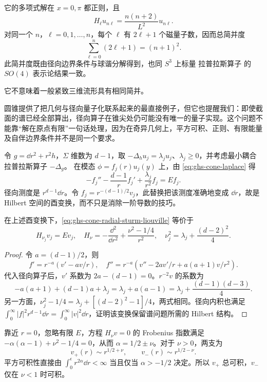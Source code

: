 它的多项式解在 $x=0,\pi$ 都正则，且
\[
 H_\ell u_{n\ell}=\frac{n(n+2)}{L^2}u_{n\ell}.
\]
对同一个 $n$，$\ell=0,1,\ldots,n$，每个 $\ell$ 有 $2\ell+1$ 个磁量子数，因而总简并度
\[
 \sum_{\ell=0}^{n}(2\ell+1)=(n+1)^2.
\]
此简并度既由径向边界条件与球谐分解得到，也同 $S^3$ 上标量 拉普拉斯算子 的 $SO(4)$ 表示论结果一致。

它不意味着一般紧致三维流形具有相同简并。

圆锥提供了把几何与径向量子化联系起来的最直接例子，但它也提醒我们：即使截面的谱已经全部算出，径向算子在锥尖处仍可能没有唯一的量子实现。这个问题不能靠“解在原点有限”一句话处理，因为在奇异几何上，平方可积、正则、有限能量及自伴边界条件并不是同一个要求。

令 $g=\dd r^2+r^2h$，$\Sigma$ 维数为 $d-1$，取 $-\Delta_hu_j=\lambda_ju_j$、$\lambda_j\geq0$，并考虑最小耦合 拉普拉斯算子 $-\Delta_g$。
在模态 $\phi=f_j(r)u_j(y)$ 上，由 \cref{eq:ghs-cone-laplace} 得
\begin{equation}\label{eq:ghs-cone-radial-sturm-liouville}
 -f_j''-\frac{d-1}{r}f_j'+\frac{\lambda_j}{r^2}f_j=E f_j.
\end{equation}
径向测度是 $r^{d-1}\dd r$。令 $f_j=r^{-(d-1)/2}v_j$，此替换把该测度准确地变成 $\dd r$，故是 Hilbert 空间的酉变换，而不只是消除一阶导数的技巧。

\begin{proposition}[逆平方径向算子]
在上述酉变换下，\cref{eq:ghs-cone-radial-sturm-liouville} 等价于
\begin{equation}\label{eq:ghs-inverse-square-radial}
 H_{\nu_j}v_j=Ev_j,
 \quad H_\nu=-\frac{\dd^2}{\dd r^2}+\frac{\nu^2-1/4}{r^2},
 \quad \nu_j^2=\lambda_j+\frac{(d-2)^2}{4}.
\end{equation}
\end{proposition}
\begin{proof}
令 $a=(d-1)/2$，则
\[
 f'=r^{-a}(v'-av/r),\quad
 f''=r^{-a}(v''-2av'/r+a(a+1)v/r^2).
\]
代入径向算子后，$v'$ 系数为 $2a-(d-1)=0$。$r^{-2}v$ 的系数为
\[
 -a(a+1)+(d-1)a+\lambda_j
 =\lambda_j+a(a-1)
 =\lambda_j+\frac{(d-1)(d-3)}4.
\]
另一方面，$\nu_j^2-1/4=\lambda_j+[(d-2)^2-1]/4$，两式相同。径向内积也满足
$\int_0^\infty|f|^2r^{d-1}\dd r=\int_0^\infty|v|^2\dd r$，证明该变换保留谱问题所需的 Hilbert 结构。
\end{proof}

靠近 $r=0$，忽略有限 $E$，方程 $H_\nu v=0$ 的 Frobenius 指数满足
$-\alpha(\alpha-1)+\nu^2-1/4=0$，从而 $\alpha=1/2\pm\nu$。对于 $\nu>0$，两支为
\begin{equation}\label{eq:ghs-inverse-square-indicial}
 v_+(r)\sim r^{1/2+\nu},\qquad v_-(r)\sim r^{1/2-\nu}.
\end{equation}
平方可积性直接由 $\int_0^\epsilon r^{2\alpha}\dd r<\infty$ 当且仅当 $\alpha>-1/2$ 决定。所以 $v_+$ 总可积，$v_-$ 仅在 $\nu<1$ 时可积。

